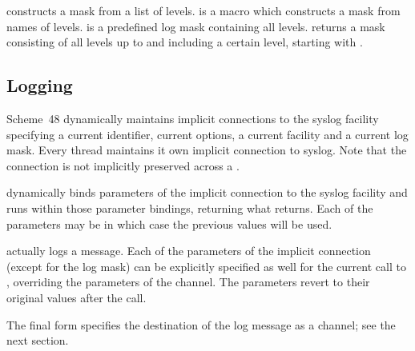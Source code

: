 \begin{protos}
\end{protos}
\noindent
{} constructs a mask from a list of levels.
 is a macro which constructs a mask from names of
levels.   is a predefined log mask containing
all levels.   returns a mask consisting of all
levels up to and including a certain level, starting with
.

\subsection*{Logging}

Scheme~48 dynamically maintains implicit connections to the syslog
facility specifying a current identifier, current options, a current
facility and a current log mask.  Every thread
maintains it own implicit connection to syslog.  Note that the
connection is not implicitly preserved across a .

\begin{protos}
\end{protos}
\noindent
{} dynamically binds parameters of the
implicit connection to the syslog facility and runs 
within those parameter bindings, returning what 
returns.  Each of the parameters may be  in which case the
previous values will be used.

\begin{protos}
\end{protos}
\noindent
{} actually logs a message.  Each of the parameters of the
implicit connection (except for the log mask) can be explicitly
specified as well for the current call to , overriding
the parameters of the channel.  The parameters revert to their
original values after the call.

The final form specifies the destination of the log message as a
channel; see the next section.

